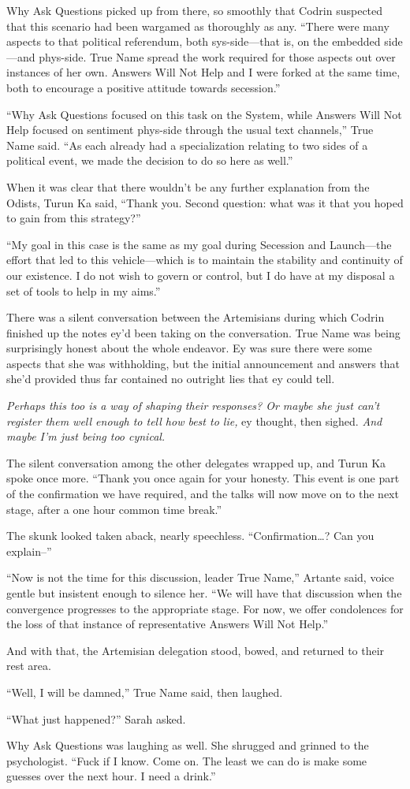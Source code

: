 Why Ask Questions picked up from there, so smoothly that Codrin suspected that this scenario had been wargamed as thoroughly as any. ``There were many aspects to that political referendum, both sys-side—that is, on the embedded side—and phys-side. True Name spread the work required for those aspects out over instances of her own. Answers Will Not Help and I were forked at the same time, both to encourage a positive attitude towards secession.''

``Why Ask Questions focused on this task on the System, while Answers Will Not Help focused on sentiment phys-side through the usual text channels,'' True Name said. ``As each already had a specialization relating to two sides of a political event, we made the decision to do so here as well.''

When it was clear that there wouldn't be any further explanation from the Odists, Turun Ka said, ``Thank you. Second question: what was it that you hoped to gain from this strategy?''

``My goal in this case is the same as my goal during Secession and Launch—the effort that led to this vehicle—which is to maintain the stability and continuity of our existence. I do not wish to govern or control, but I do have at my disposal a set of tools to help in my aims.''

There was a silent conversation between the Artemisians during which Codrin finished up the notes ey'd been taking on the conversation. True Name was being surprisingly honest about the whole endeavor. Ey was sure there were some aspects that she was withholding, but the initial announcement and answers that she'd provided thus far contained no outright lies that ey could tell.

\emph{Perhaps this too is a way of shaping their responses? Or maybe she just can't register them well enough to tell how best to lie,} ey thought, then sighed. \emph{And maybe I'm just being too cynical.}

The silent conversation among the other delegates wrapped up, and Turun Ka spoke once more. ``Thank you once again for your honesty. This event is one part of the confirmation we have required, and the talks will now move on to the next stage, after a one hour common time break.''

The skunk looked taken aback, nearly speechless. ``Confirmation\ldots? Can you explain--''

``Now is not the time for this discussion, leader True Name,'' Artante said, voice gentle but insistent enough to silence her. ``We will have that discussion when the convergence progresses to the appropriate stage. For now, we offer condolences for the loss of that instance of representative Answers Will Not Help.''

And with that, the Artemisian delegation stood, bowed, and returned to their rest area.

``Well, I will be damned,'' True Name said, then laughed.

``What just happened?'' Sarah asked.

Why Ask Questions was laughing as well. She shrugged and grinned to the psychologist. ``Fuck if I know. Come on. The least we can do is make some guesses over the next hour. I need a drink.''
